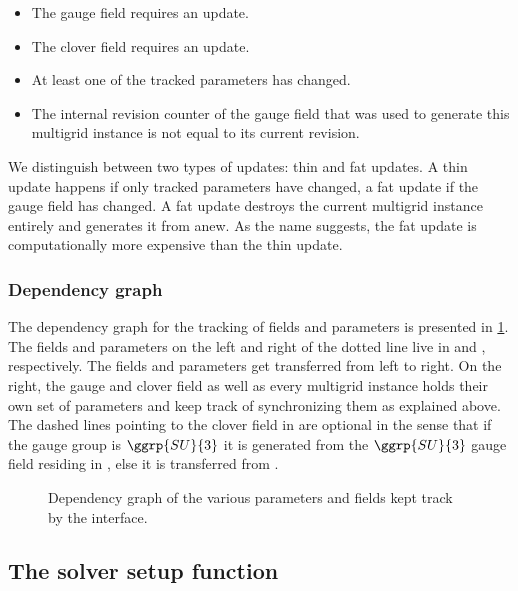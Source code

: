 \begin{itemize}
  \item The gauge field requires an update.
  \item The clover field requires an update.
  \item At least one of the tracked parameters has changed.
  \item The internal revision counter of the gauge field that was used to generate this multigrid instance is not equal to its current revision.
\end{itemize}
We distinguish between two types of updates: thin and fat updates.
A thin update happens if only tracked parameters have changed, a fat update if the gauge field has changed.
A fat update destroys the current multigrid instance entirely and generates it from anew.
As the name suggests, the fat update is computationally more expensive than the thin update.

\subsubsection{Dependency graph}

The dependency graph for the tracking of fields and parameters is presented in \cref{fig:dep}.
The fields and parameters on the left and right of the dotted line live in \openqxd and \quda, respectively.
The fields and parameters get transferred from left to right.
On the right, the gauge and clover field as well as every multigrid instance holds their own set of parameters and keep track of synchronizing them as explained above.
The dashed lines pointing to the clover field in \quda are optional in the sense that if the gauge group is $\ggrp{SU}{3}$ it is generated from the $\ggrp{SU}{3}$ gauge field residing in \quda, else it is transferred from \openqxd.
\begin{figure}
  
  \caption{Dependency graph of the various parameters and fields kept track by the interface.}
  \label{fig:dep}
\end{figure}

\subsection{The solver setup function}
\label{sec:interface:getsolverhandle}

